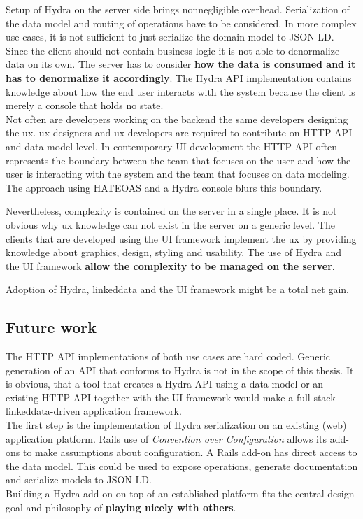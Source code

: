 Setup of Hydra on the server side brings nonnegligible overhead. Serialization of the data model and routing of operations have to be considered. In more complex use cases, it is not sufficient to just serialize the domain model to JSON-LD. Since the client should not contain business logic it is not able to denormalize data on its own. The server has to consider \textbf{how the data is consumed and it has to denormalize it accordingly}. The Hydra API implementation contains knowledge about how the end user interacts with the system because the client is merely a \gls{console} that holds no state. \\
Not often are developers working on the \gls{backend} the same developers designing the \gls{ux}. \gls{ux} designers and \gls{ux} developers are required to contribute on HTTP API and data model level. In contemporary UI development the HTTP API often represents the boundary between the team that focuses on the user and how the user is interacting with the system and the team that focuses on data modeling. The approach using HATEOAS and a Hydra \gls{console} blurs this boundary.

Nevertheless, complexity is contained on the server in a single place. It is not obvious why \gls{ux} knowledge can not exist in the server on a generic level. The clients that are developed using the UI framework implement the \gls{ux} by providing knowledge about graphics, design, styling and usability. The use of Hydra and the UI framework \textbf{allow the complexity to be managed on the server}.

Adoption of Hydra, \gls{linkeddata} and the UI framework might be a total net gain.

\subsection{Future work}
The HTTP API implementations of both use cases are hard coded. Generic generation of an API that conforms to Hydra is not in the scope of this thesis. It is obvious, that a tool that creates a Hydra API using a data model or an existing HTTP API together with the UI framework would make a full-stack \gls{linkeddata}-driven application framework. \\
The first step is the implementation of Hydra serialization on an existing (web) application platform. Rails use of \textit{Convention over Configuration} allows its add-ons to make assumptions about configuration. A Rails add-on has direct access to the data model. This could be used to expose operations, generate documentation and serialize models to JSON-LD. \\
Building a Hydra add-on on top of an established platform fits the central design goal and philosophy of \textbf{playing nicely with others}.
